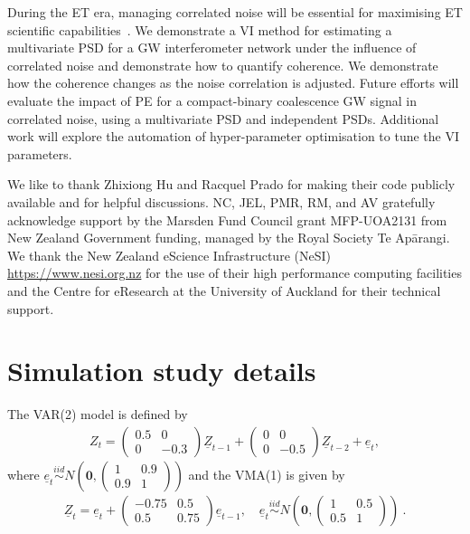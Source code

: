 \documentclass[%
 reprint,
 amsmath,amssymb,
 aps,
]{revtex4-2}
\begin{document}
During the \ac{ET} era, managing correlated noise will be essential for maximising \ac{ET} scientific capabilities~\cite{Cireddu:2023:arXiv}.
We demonstrate a VI method for estimating a multivariate PSD for a \ac{GW} interferometer network under the influence of correlated noise and demonstrate how to quantify coherence. 
We demonstrate how the coherence changes as the noise correlation is adjusted. 
Future efforts will evaluate the impact of \ac{PE} for a compact-binary coalescence \ac{GW} signal in correlated noise, using a multivariate PSD and independent PSDs. 
Additional work will explore the automation of hyper-parameter optimisation to tune the \ac{VI} parameters. 


\begin{acknowledgments}
We like to thank Zhixiong Hu and Racquel Prado for making their code publicly available and for helpful discussions. NC, JEL, PMR, RM, and AV gratefully acknowledge support  by the Marsden Fund Council grant MFP-UOA2131 from New Zealand Government funding, managed by the Royal Society Te Apārangi. We thank the New Zealand eScience Infrastructure
(NeSI) \url{https://www.nesi.org.nz} for the use of their high performance computing facilities and
the Centre for eResearch at the University of Auckland for their technical
support.
\end{acknowledgments}


\appendix  

\section{Simulation study details}
\label{appdx:simstudy}
The VAR(2) model is defined by
\begin{align}
Z_t = \begin{pmatrix}0.5 & 0 \\0 & -0.3\end{pmatrix}\underline{Z}_{t-1}+\begin{pmatrix}0 & 0 \\0 & -0.5\end{pmatrix}\underline{Z}_{t-2}+\underline{e}_t, %
\end{align}
 where $\underline{e}_t\overset{iid}{\sim}N \left(\bm{0}, \begin{pmatrix}1 & 0.9 \\0.9 & 1 \end{pmatrix}  \right) $ and the VMA(1) is given by
\begin{align}
\underline{Z}_t =\underline{e}_t+\begin{pmatrix}-0.75 & 0.5 \\0.5 & 0.75\end{pmatrix}\underline{e}_{t-1}, \quad \underline{e}_t\overset{iid}{\sim}N \left(\bm{0}, \begin{pmatrix}1 & 0.5 \\0.5 & 1\end{pmatrix}\right)\ .
\end{align}
\end{document}

